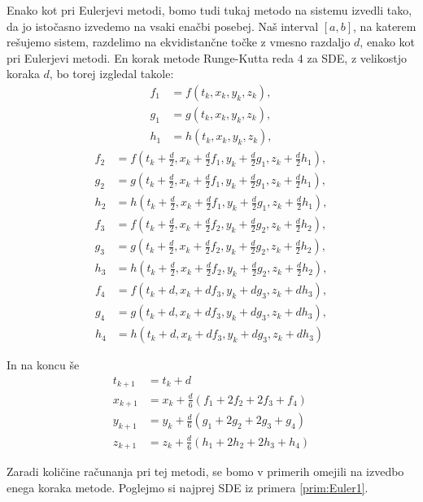 \documentclass[a4paper, 10pt]{article}
\begin{document}
			Enako kot pri Eulerjevi metodi, bomo tudi tukaj metodo na sistemu izvedli tako, da jo istočasno izvedemo na vsaki enačbi posebej. Naš interval $[a, b]$, na katerem rešujemo sistem, razdelimo na ekvidistančne točke z vmesno razdaljo $d$, enako kot pri Eulerjevi metodi. En korak metode Runge-Kutta reda $4$ za SDE, z velikostjo koraka $d$, bo torej izgledal takole: \begin{align*}
				f_1 &= f(t_k, x_k, y_k, z_k), \\
				g_1 &= g(t_k, x_k, y_k, z_k), \\
				h_1 &= h(t_k, x_k, y_k, z_k),
			\end{align*}
			\begin{align*}
				f_2 &= f(t_k + \frac{d}{2}, x_k + \frac{d}{2}f_1, y_k+ \frac{d}{2}g_1, z_k+ \frac{d}{2}h_1), \\
				g_2 &= g(t_k + \frac{d}{2}, x_k + \frac{d}{2}f_1, y_k+ \frac{d}{2}g_1, z_k+ \frac{d}{2}h_1), \\
				h_2 &= h(t_k + \frac{d}{2}, x_k + \frac{d}{2}f_1, y_k+ \frac{d}{2}g_1, z_k+ \frac{d}{2}h_1),
			\end{align*} 
			\begin{align*}
				f_3 &= f(t_k + \frac{d}{2}, x_k + \frac{d}{2}f_2, y_k+ \frac{d}{2}g_2, z_k+ \frac{d}{2}h_2), \\
				g_3 &= g(t_k + \frac{d}{2}, x_k + \frac{d}{2}f_2, y_k+ \frac{d}{2}g_2, z_k+ \frac{d}{2}h_2), \\
				h_3 &= h(t_k + \frac{d}{2}, x_k + \frac{d}{2}f_2, y_k+ \frac{d}{2}g_2, z_k+ \frac{d}{2}h_2), 
			\end{align*}
			\begin{align*} 
				f_4 &= f(t_k + d, x_k + df_3, y_k+ dg_3, z_k+ dh_3), \\
				g_4 &= g(t_k + d, x_k + df_3, y_k+ dg_3, z_k+ dh_3), \\
				h_4 &= h(t_k + d, x_k + df_3, y_k+ dg_3, z_k+ dh_3)
			\end{align*}
			
			In na koncu še \begin{align*}
				t_{k+1} &= t_k + d \\
				x_{k+1} &= x_k + \frac{d}{6}(f_1 + 2f_2 + 2f_3 + f_4) \\
				y_{k+1} &= y_k + \frac{d}{6}(g_1 + 2g_2 + 2g_3 + g_4) \\
				z_{k+1} &= z_k + \frac{d}{6}(h_1 + 2h_2 + 2h_3 + h_4)
			\end{align*}
			
			Zaradi količine računanja pri tej metodi, se bomo v primerih omejili na izvedbo enega koraka metode. Poglejmo si najprej SDE iz primera \ref{prim:Euler1}.
			
\end{document}
